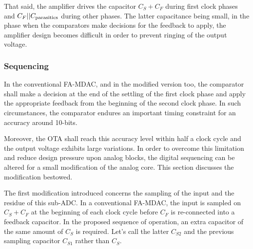 That said, the amplifier drives the capacitor $C_S+C_F$ during first clock phases and $C_F||C_{\rm parasitics}$ during other phases. The latter capacitance being small, in the phase when the comparators make decisions for the feedback to apply, the amplifier design becomes difficult in order to prevent ringing of the output voltage. 

	\subsubsection{Sequencing}
In the conventional FA-MDAC, and in the modified version too, the comparator shall make a decision at the end of the settling of the first clock phase and apply the appropriate feedback from the beginning of the second clock phase. In such circumstances, the comparator endures an important timing constraint for an accuracy around 10-bits.

Moreover, the OTA shall reach this accuracy level within half a clock cycle and the output voltage exhibits large variations. In order to overcome this limitation and reduce design pressure upon analog blocks, the digital sequencing can be altered for a small modification of the analog core. This section discusses the modification bestowed.

The first modification introduced concerns the sampling of the input and the residue of this sub-ADC\@. In a conventional FA-MDAC, the input is sampled on \(C_S + C_F\) at the beginning of each clock cycle before \(C_F\) is re-connected into a feedback capacitor. In the proposed sequence of operation, an extra capacitor of the same amount of \(C_S\) is required. Let's call the latter \(C_{S2}\) and the previous sampling capacitor \(C_{S1}\) rather than \(C_S\).

